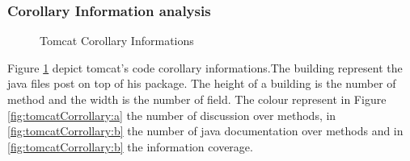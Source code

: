 \documentclass[]{usiinfbachelorproject}
\begin{document}
\subsubsection{Corollary Information analysis}
\begin{figure}[h]
\hspace*{\fill}

\centering
{}

%

\caption{Tomcat Corollary Informations \label{fig:tomcatCorrollary}
}
\end{figure}
Figure \ref{fig:tomcatCorrollary} depict tomcat's code corollary  informations.The building represent the java files post on top of his package. The height of a building is the number of method and the width is the number of field. The colour represent in Figure \ref{fig:tomcatCorrollary:a} the number of discussion over methods, in \ref{fig:tomcatCorrollary:b} the number of java documentation over methods and  in \ref{fig:tomcatCorrollary:b} the information coverage.\\
\end{document}
